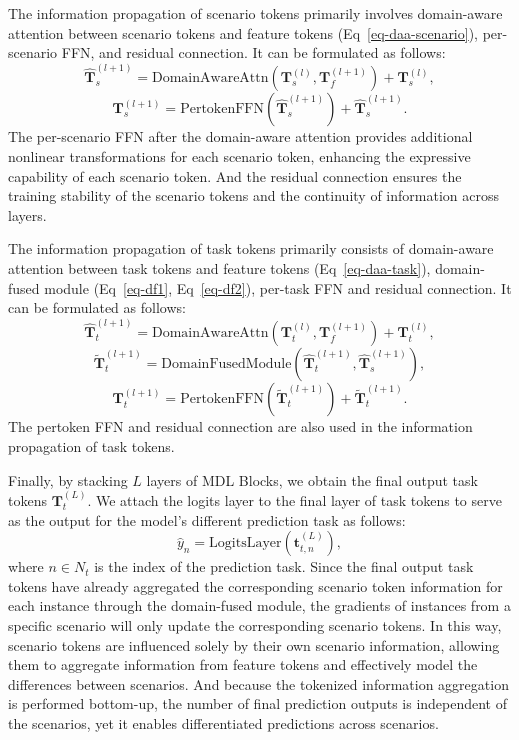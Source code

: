 The information propagation of scenario tokens primarily involves domain-aware attention between scenario tokens and feature tokens (Eq~\ref{eq-daa-scenario}), per-scenario FFN, and residual connection.
It can be formulated as follows:
\begin{equation}
    \bm{\hat{T}}_{s}^{(l + 1)} = \text{DomainAwareAttn}(\bm{T}_{s}^{(l)}, \bm{T}_f^{(l + 1)}) + \bm{T}_{s}^{(l)},
\end{equation}
\begin{equation}
    \bm{T}_{s}^{(l + 1)} = \text{PertokenFFN}(\bm{\hat{T}}_{s}^{(l + 1)}) + \bm{\hat{T}}_{s}^{(l + 1)}.
\end{equation}
The per-scenario FFN after the domain-aware attention provides additional nonlinear transformations for each scenario token, enhancing the expressive capability of each scenario token.
And the residual connection ensures the training stability of the scenario tokens and the continuity of information across layers.

The information propagation of task tokens primarily consists of domain-aware attention between task tokens and feature tokens (Eq~\ref{eq-daa-task}), domain-fused module (Eq~\ref{eq-df1}, Eq~\ref{eq-df2}), per-task FFN and residual connection.
It can be formulated as follows:
\begin{equation}
    \bm{\hat{T}}_{t}^{(l + 1)} = \text{DomainAwareAttn}(\bm{T}_{t}^{(l)}, \bm{T}_f^{(l + 1)}) + \bm{T}_{t}^{(l)},
\end{equation}
\begin{equation}
    \bm{\tilde{T}}_t^{(l+1)} = \text{DomainFusedModule}(\bm{\hat{T}}_{t}^{(l + 1)}, \bm{\hat{T}}_{s}^{(l + 1)}),
\end{equation}
\begin{equation}
    \bm{T}_t^{(l+1)} = \text{PertokenFFN}(\bm{\tilde{T}}_t^{(l+1)}) + \bm{\tilde{T}}_t^{(l+1)}.
\end{equation}
The pertoken FFN and residual connection are also used in the information propagation of task tokens.

Finally, by stacking $L$ layers of MDL Blocks, we obtain the final output task tokens $\bm{T}_t^{(L)}$.
We attach the logits layer to the final layer of task tokens to serve as the output for the model's different prediction task as follows:
\begin{equation}
    \hat{y}_{n} = \text{LogitsLayer}(\bm{t}_{t,n}^{(L)}),
\end{equation}
where $n \in N_{t}$ is the index of the prediction task.
Since the final output task tokens have already aggregated the corresponding scenario token information for each instance through the domain-fused module, the gradients of instances from a specific scenario will only update the corresponding scenario tokens. 
In this way, scenario tokens are influenced solely by their own scenario information, allowing them to aggregate information from feature tokens and effectively model the differences between scenarios.
And because the tokenized information aggregation is performed bottom-up, the number of final prediction outputs is independent of the scenarios, yet it enables differentiated predictions across scenarios.
